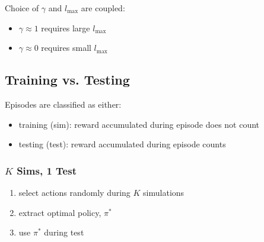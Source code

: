 \begin{notes}
    Choice of $\gamma$ and $l_{\max}$ are coupled:
    \begin{itemize}
        \item $\gamma \approx 1$ requires large $l_{\max}$
        \item $\gamma \approx 0$ requires small $l_{\max}$
    \end{itemize}
\end{notes}
\newpage


\subsection{Training vs. Testing}
\begin{notes}
    Episodes are classified as either:
    \begin{itemize}
        \item training (sim): reward accumulated during episode does not count
        \item testing (test): reward accumulated during episode counts
    \end{itemize}
\end{notes}

\subsubsection{$K$ Sims, 1 Test}
\begin{notes}
    \begin{enumerate}
        \item select actions randomly during $K$ simulations
        \item extract optimal policy, $\pi^*$
        \item use $\pi^*$ during test
    \end{enumerate}    
\end{notes}

